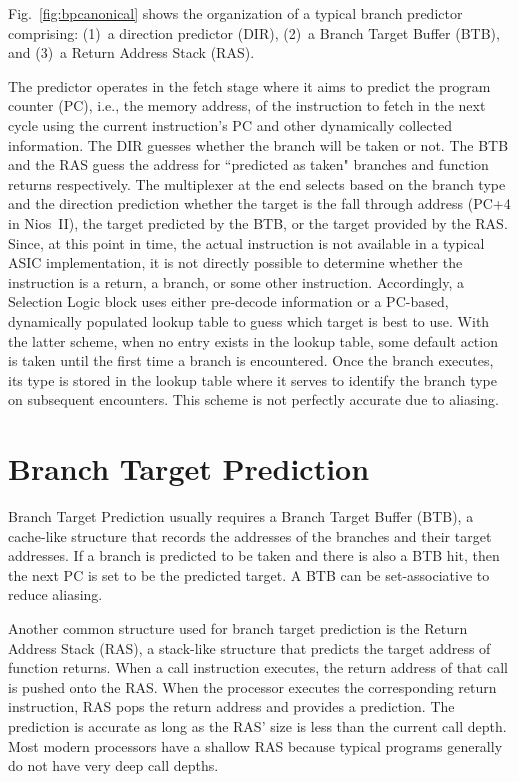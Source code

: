 Fig.~\ref{fig:bpcanonical} shows the organization of a typical branch predictor comprising: (1)~a direction predictor (DIR), (2)~a Branch Target Buffer (BTB), and (3)~a Return Address Stack (RAS).  

The predictor operates in the fetch stage where it aims to predict the program counter (PC), i.e., the memory address, of the instruction to fetch in the next cycle using the current instruction's PC and other dynamically collected information. The DIR guesses whether the branch will be taken or not. The BTB and the RAS guess the address for ``predicted as taken" branches and function returns respectively. The multiplexer at the end selects based on the branch type and the direction prediction whether the target is the fall through address (PC+4 in Nios~II), the target predicted by the BTB, or the target provided by the RAS. Since, at this point in time, the actual instruction is not available in a typical ASIC implementation, it is not directly possible to determine whether the instruction is a return, a branch, or some other instruction. Accordingly, a Selection Logic block uses either pre-decode information or a PC-based, dynamically populated lookup table to guess which target is best to use. With the latter scheme, when no entry exists in the lookup table, some default action is taken until the first time a branch is encountered. Once the branch executes, its type is stored in the lookup table where it serves to identify the branch type on subsequent encounters. This scheme is not perfectly accurate due to aliasing.

\section{Branch Target Prediction}
\label{sec:background:target}
Branch Target Prediction usually requires a Branch Target Buffer (BTB), a cache-like structure that records the addresses of the branches and their target addresses. If a branch is predicted to be taken and there is also a BTB hit, then the next PC is set to be the predicted target. A BTB can be set-associative to reduce aliasing.

Another common structure used for branch target prediction is the Return Address Stack (RAS),  a stack-like structure that predicts the target address of function returns. When a call instruction executes, the return address of that call is pushed onto the RAS. When the processor executes the corresponding return instruction, RAS pops the return address and provides a prediction. The prediction is accurate as long as the RAS' size is less than the current call depth. Most modern processors have a shallow RAS because typical programs generally do not have very deep call depths.


